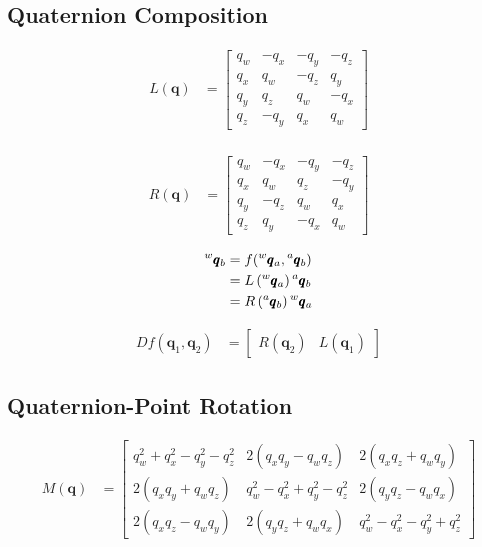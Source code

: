\documentclass{article}
\begin{document}
\subsection{Quaternion Composition}

\begin{align*}
    L \left( \pmb{q} \right) &= \begin{bmatrix}
        q_w & -q_x & -q_y & -q_z \\
        q_x & q_w & -q_z & q_y  \\
        q_y & q_z & q_w & -q_x \\
        q_z & -q_y & q_x & q_w
    \end{bmatrix} \\
\end{align*}

\begin{align*}
    R \left( \pmb{q} \right) &= \begin{bmatrix}
        q_w & -q_x & -q_y & -q_z \\
        q_x & q_w & q_z & -q_y  \\
        q_y & -q_z & q_w & q_x \\
        q_z & q_y & -q_x & q_w
    \end{bmatrix}
\end{align*}

\begin{align*}
    \prescript{w}{}{\pmb{q}}_b &= f(\prescript{w}{}{\pmb{q}}_a, \prescript{a}{}{\pmb{q}}_b) \\
    &= L \left( \prescript{w}{}{\pmb{q}}_a \right) \prescript{a}{}{\pmb{q}}_b \\
    &= R \left( \prescript{a}{}{\pmb{q}}_b \right) \prescript{w}{}{\pmb{q}}_a \\
\end{align*}

\begin{align*}
    Df(\pmb{q}_1, \pmb{q}_2) &= \begin{bmatrix}
        R(\pmb{q}_2) & L(\pmb{q}_1)
    \end{bmatrix}
\end{align*}

\subsection{Quaternion-Point Rotation}

\begin{align*}
    M\left( \pmb{q} \right) &= \begin{bmatrix}
        q_w^2 + q_x^2 - q_y^2 - q_z^2 & 2(q_x q_y - q_w q_z) & 2(q_x q_z + q_w q_y) \\
        2(q_x q_y + q_w q_z) & q_w^2 - q_x^2 + q_y^2 - q_z^2 & 2(q_y q_z - q_w q_x) \\
        2(q_x q_z - q_w q_y) & 2(q_y q_z + q_w q_x) & q_w^2 - q_x^2 - q_y^2 + q_z^2
    \end{bmatrix}
\end{align*}
\end{document}
